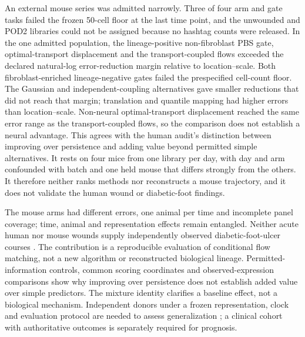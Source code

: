 An external mouse series was admitted narrowly. Three of four arm and gate tasks failed the frozen 50-cell floor at the last time point, and the unwounded and POD2 libraries could not be assigned because no hashtag counts were released. In the one admitted population, the lineage-positive non-fibroblast PBS gate, optimal-transport displacement and the transport-coupled flows exceeded the declared natural-log error-reduction margin relative to location--scale. Both fibroblast-enriched lineage-negative gates failed the prespecified cell-count floor. The Gaussian and independent-coupling alternatives gave smaller reductions that did not reach that margin; translation and quantile mapping had higher errors than location--scale. Non-neural optimal-transport displacement reached the same error range as the transport-coupled flows, so the comparison does not establish a neural advantage. This agrees with the human audit's distinction between improving over persistence and adding value beyond permitted simple alternatives. It rests on four mice from one library per day, with day and arm confounded with batch and one held mouse that differs strongly from the others. It therefore neither ranks methods nor reconstructs a mouse trajectory, and it does not validate the human wound or diabetic-foot findings.

The mouse arms had different errors, one animal per time and incomplete panel coverage; time, animal and representation effects remain entangled. Neither acute human nor mouse wounds supply independently observed diabetic-foot-ulcer courses \citep{armstrong2017}. The contribution is a reproducible evaluation of conditional flow matching, not a new algorithm or reconstructed biological lineage. Permitted-information controls, common scoring coordinates and observed-expression comparisons show why improving over persistence does not establish added value over simple predictors. The mixture identity clarifies a baseline effect, not a biological mechanism. Independent donors under a frozen representation, clock and evaluation protocol are needed to assess generalization \citep{roberts2017}; a clinical cohort with authoritative outcomes is separately required for prognosis.
